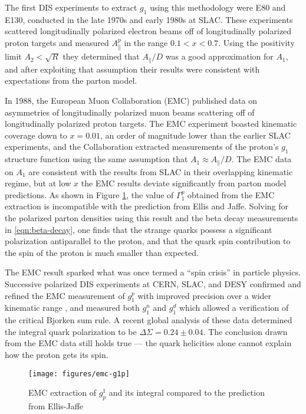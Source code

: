 The first DIS experiments to extract $g_1$ using this methodology were E80 and
E130, conducted in the late 1970s and early 1980s at SLAC. These experiments
scattered longitudinally polarized electron beams off of longitudinally
polarized proton targets and measured $A_{\parallel}^p$ in the range $0.1 < x <
0.7$. Using the positivity limit $A_2 < \sqrt{R}$ they determined that
$A_{\parallel}/D$ was a good approximation for $A_1$, and after exploiting that
assumption their results \cite{Alguard:1976bm, Baum:1983ha} were consistent with
expectations from the parton model.

In 1988, the European Muon Collaboration (EMC) published data on asymmetries of
longitudinally polarized muon beams scattering off of longitudinally polarized
proton targets. The EMC experiment boasted kinematic coverage down to $x =
0.01$, an order of magnitude lower than the earlier SLAC experiments, and the
Collaboration extracted measurements of the proton's $g_1$ structure function
using the same assumption that $A_1 \approx A_{\parallel}/D$. The EMC data on
$A_1$ are consistent with the results from SLAC in their overlapping kinematic
regime, but at low $x$ the EMC results deviate significantly from parton model
predictions. As shown in Figure \ref{fig:emc-g1p}, the value of $\Gamma_1^p$
obtained from the EMC extraction is incompatible with the prediction from Ellis
and Jaffe. Solving for the polarized parton densities using this result and the
beta decay measurements in \ref{eqn:beta-decay}, one finds that the strange
quarks possess a significant polarization antiparallel to the proton, and that
the quark spin contribution to the spin of the proton is much smaller than
expected.

The EMC result sparked what was once termed a ``spin crisis'' in particle
physics. Successive polarized DIS experiments at CERN, SLAC, and DESY confirmed
and refined the EMC measurement of \(g_1^p\) with improved precision over a
wider kinematic range \cite{Adams:1994zd}, and measured both \(g_1^n\)
\cite{Anthony:1993uf} and \(g_1^d\) \cite{Adeva:1993km} which allowed a
verification of the critical Bjorken sum rule. A recent global analysis
\cite{Leader:2006xc} of these data determined the integral quark polarization to
be \(\Delta \Sigma = 0.24 \pm 0.04\). The conclusion drawn from the EMC data
still holds true --- the quark helicities alone cannot explain how the proton
gets its spin.

\begin{figure}
  \texttt{[image: figures/emc-g1p]}
  \caption{EMC extraction of $g^1_p$ and its integral compared to the prediction from Ellis-Jaffe \cite{Ashman:1987hv}}
  \label{fig:emc-g1p}
\end{figure}
